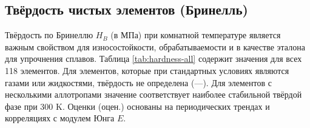 \documentclass[12pt,a4paper]{article}
\begin{document}
	\subsection{Твёрдость чистых элементов (Бринелль)}
	\label{subsec:hardness}
	
	Твёрдость по Бринеллю \(H_B\) (в МПа) при комнатной температуре является важным свойством для износостойкости, обрабатываемости и в качестве эталона для упрочнения сплавов. Таблица \ref{tab:hardness-all} содержит значения для всех 118 элементов. Для элементов, которые при стандартных условиях являются газами или жидкостями, твёрдость не определена (—). Для элементов с несколькими аллотропами значение соответствует наиболее стабильной твёрдой фазе при 300 K. Оценки (оцен.) основаны на периодических трендах и корреляциях с модулем Юнга \(E\).
	
\end{document}
